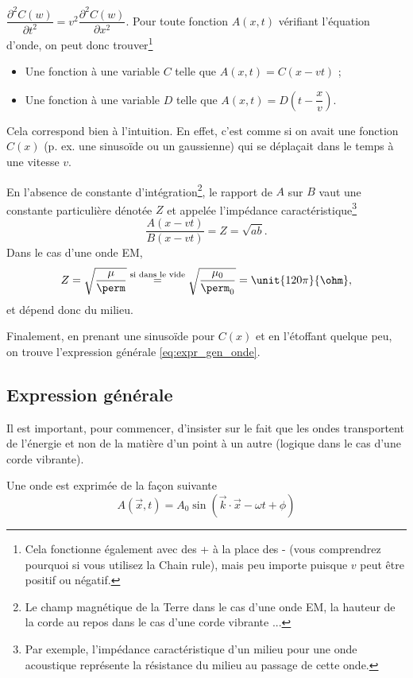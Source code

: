 $ \dfrac{\partial^2 C(w)}{\partial t^2} =
v^2 \dfrac{\partial^2 C(w)}{\partial x^2} $. Pour toute fonction $A(x,t)$ vérifiant l'équation d'onde, on peut donc trouver\footnote{Cela fonctionne également avec des + à la place des - (vous comprendrez pourquoi si vous utilisez la Chain rule), mais peu importe puisque $v$ peut être positif ou négatif.}
\begin{itemize}
\item Une fonction à une variable $C$ telle que $A(x,t) = C(x-vt)$ ;
\item Une fonction à une variable $D$ telle que $A(x,t) = D(t-\dfrac{x}{v})$.
\end{itemize}
Cela correspond bien à l'intuition. En effet, c'est comme si on avait une fonction $C(x)$ (p. ex. une sinusoïde ou un gaussienne) qui se déplaçait dans le temps à une vitesse $v$.

En l'absence de constante d'intégration\footnote{Le champ magnétique de la Terre dans le cas d'une onde EM, la hauteur de la corde au repos dans le cas d'une corde vibrante ...}, le rapport de $A$ sur $B$ vaut une constante particulière dénotée $Z$ et appelée l'impédance
caractéristique\footnote{Par exemple, l'impédance caractéristique d'un milieu pour une onde acoustique représente la résistance
du milieu au passage de cette onde.}
\[
\dfrac{A(x-vt)}{B(x-vt)} = Z = \sqrt{ab}.
\]
Dans le cas d'une onde EM,
\[
Z = \sqrt{\dfrac{\mu}{\perm}} \overset{\text{si dans le vide}}{=} \sqrt{\dfrac{\mu_0}{\perm_0}} = \unit{120\pi}{\ohm},
\]
et dépend donc du milieu.

Finalement, en prenant une sinusoïde pour $C(x)$ et en l'étoffant quelque peu, on trouve l'expression générale \eqref{eq:expr_gen_onde}.

\subsection{Expression générale}
Il est important, pour commencer, d'insister sur le fait
que les ondes transportent de l'énergie et non de la matière
d'un point à un autre (logique dans le cas d'une corde vibrante).

Une onde est exprimée de la façon suivante
\begin{equation} \label{eq:expr_gen_onde}
A(\vec{x}, t) = A_0 \sin(\vec{k} \cdot \vec{x} - \omega t + \phi)
\end{equation}

